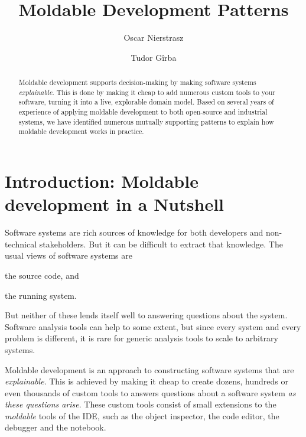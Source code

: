 \documentclass[sigconf]{acmart}
\begin{document}
\title[Moldable Development Patterns --- DRAFT]{Moldable Development Patterns}

\author{Oscar Nierstrasz}

\author{Tudor G\^irba}

\renewcommand{\shortauthors}{Nierstrasz and G\^irba} %

\begin{abstract}
Moldable development supports decision-making by making software systems \emph{explainable}.
This is done by making it cheap to add numerous custom tools to your software, turning it into a live, explorable domain model.
Based on several years of experience of applying moldable development to both open-source and industrial systems, we have identified numerous mutually supporting patterns to explain how moldable development works in practice.
\end{abstract}


\maketitle

\section{Introduction: Moldable development in a Nutshell}

Software systems are rich sources of knowledge for both developers and non-technical stakeholders.
But it can be difficult to extract that knowledge.
The usual views of software systems are
\begin{inparaenum}[(i)]
\item the source code, and
\item the running system.
\end{inparaenum}
But neither of these lends itself well to answering questions about the system.
Software analysis tools can help to some extent, but since every system and every problem is different, it is rare for generic analysis tools to scale to arbitrary systems.

Moldable development is an approach to constructing software systems that are \emph{explainable}.
This is achieved by making it cheap to create dozens, hundreds or even thousands of custom tools to answers questions about a software system \emph{as these questions arise}.
These custom tools consist of small extensions to the \emph{moldable} tools of the IDE, such as the object inspector, the code editor, the debugger and the notebook.
\end{document}

